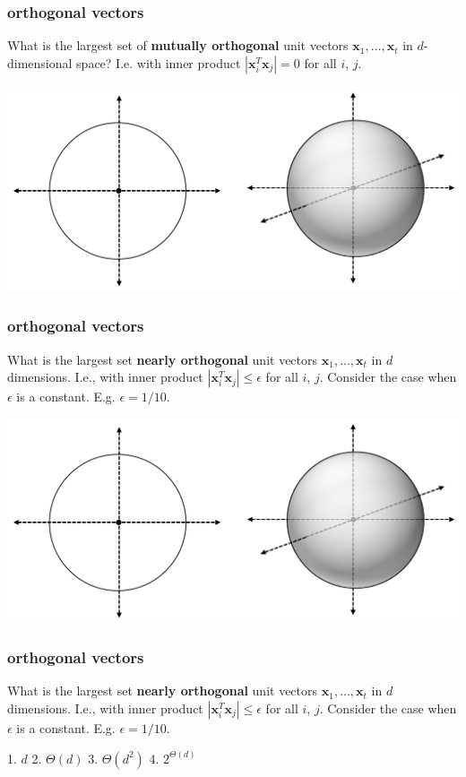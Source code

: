 \documentclass[compress]{beamer}
\newcommand{\bv}[1]{\mathbf{#1}}
\begin{document}
\begin{frame}[t]
	\frametitle{orthogonal vectors}
	\begin{center}
		\alert{What is the largest set of \textbf{mutually orthogonal} unit vectors $\bv{x}_1, \ldots, \bv{x}_t$ in $d$-dimensional space? I.e. with inner product $|\bv{x}_i^T\bv{x}_j| = 0$ for all $i$, $j$.}
		\begin{center}
			\includegraphics[width=.8\textwidth]{dimension_vis.png}
		\end{center}
	\end{center}
	
	
\end{frame}

\begin{frame}[t]
	\frametitle{orthogonal vectors}
	\begin{center}
		\alert{What is the largest set \textbf{nearly orthogonal} unit vectors $\bv{x}_1, \ldots, \bv{x}_t$ in $d$ dimensions. I.e., with inner product $|\bv{x}_i^T\bv{x}_j| \leq \epsilon$ for all $i$, $j$. Consider the case when $\epsilon$ is a constant. E.g. $\epsilon = 1/10$. }

			\includegraphics[width=.8\textwidth]{dimension_vis.png}
	\end{center}
		

\end{frame}

\begin{frame}[t]
	\frametitle{orthogonal vectors}
	\begin{center}
			\alert{What is the largest set \textbf{nearly orthogonal} unit vectors $\bv{x}_1, \ldots, \bv{x}_t$ in $d$ dimensions. I.e., with inner product $|\bv{x}_i^T\bv{x}_j| \leq \epsilon$ for all $i$, $j$. Consider the case when $\epsilon$ is a constant. E.g. $\epsilon = 1/10$. }
		\vspace{10em}
		
		1. $d$ \hspace{3em}2. $\Theta(d)$ \hspace{3em}3. $\Theta(d^2)$ \hspace{3em}4. $2^{\Theta(d)}$   
	\end{center}
\end{frame}
\end{document}
